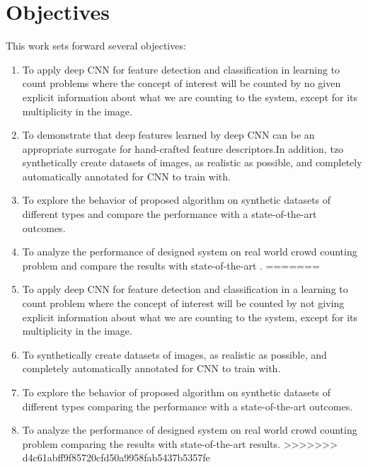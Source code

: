 \section{Objectives}
This work sets forward several objectives:
\begin{enumerate}
<<<<<<< HEAD
	\item To apply deep CNN for feature detection and classification in learning to count problems where the concept of interest will be counted by no given explicit information about what we are counting to the system, except for its multiplicity in the image.
	\item To demonstrate that deep features learned by deep CNN can be an appropriate surrogate for hand-crafted feature descriptors.In addition, tzo synthetically create datasets of images, as realistic as possible, and completely automatically annotated for CNN to train with.
	\item To explore the behavior of proposed algorithm on synthetic datasets of different types and compare the performance with a state-of-the-art outcomes\cite{segui2015learning}.   
	\item To analyze the performance of designed system on real world crowd counting problem and compare the results with state-of-the-art \cite{chan2008privacy}.   
=======
	\item To apply deep CNN for feature detection and classification in a learning to count problem where the concept of interest will be counted by not giving explicit information about what we are counting to the system, except for its multiplicity in the image. 
	\item To synthetically create datasets of images, as realistic as possible, and completely automatically annotated for CNN to train with.
	\item To explore the behavior of proposed algorithm on synthetic datasets of different types comparing the performance with a state-of-the-art outcomes\cite{segui2015learning}.   
	\item To analyze the performance of designed system on real world crowd counting problem comparing the results with state-of-the-art results\cite{chan2008privacy}.   
>>>>>>> d4c61abff9f85720cfd50a9958fab5437b5357fe

\end{enumerate}
